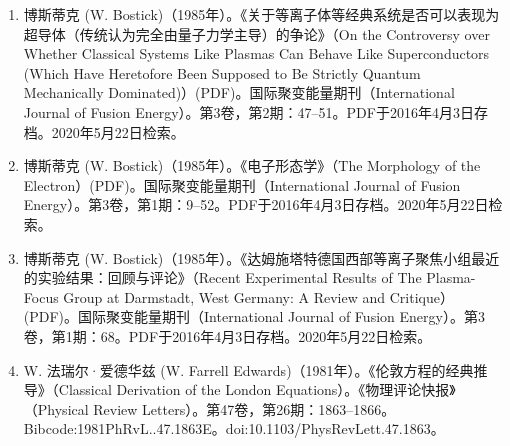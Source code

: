 \begin{enumerate}
\item 博斯蒂克 (W. Bostick)（1985年）。《关于等离子体等经典系统是否可以表现为超导体（传统认为完全由量子力学主导）的争论》（On the Controversy over Whether Classical Systems Like Plasmas Can Behave Like Superconductors (Which Have Heretofore Been Supposed to Be Strictly Quantum Mechanically Dominated)）(PDF)。国际聚变能量期刊（International Journal of Fusion Energy）。第3卷，第2期：47–51。PDF于2016年4月3日存档。2020年5月22日检索。
\item 博斯蒂克 (W. Bostick)（1985年）。《电子形态学》（The Morphology of the Electron）(PDF)。国际聚变能量期刊（International Journal of Fusion Energy）。第3卷，第1期：9–52。PDF于2016年4月3日存档。2020年5月22日检索。
\item 博斯蒂克 (W. Bostick)（1985年）。《达姆施塔特德国西部等离子聚焦小组最近的实验结果：回顾与评论》（Recent Experimental Results of The Plasma-Focus Group at Darmstadt, West Germany: A Review and Critique）(PDF)。国际聚变能量期刊（International Journal of Fusion Energy）。第3卷，第1期：68。PDF于2016年4月3日存档。2020年5月22日检索。
\item W. 法瑞尔·爱德华兹 (W. Farrell Edwards)（1981年）。《伦敦方程的经典推导》（Classical Derivation of the London Equations）。《物理评论快报》（Physical Review Letters）。第47卷，第26期：1863–1866。Bibcode:1981PhRvL..47.1863E。doi:10.1103/PhysRevLett.47.1863。
\end{enumerate}  